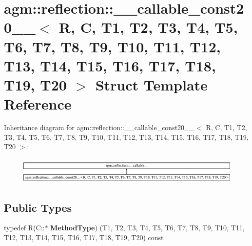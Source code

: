 \hypertarget{structagm_1_1reflection_1_1____callable__const20____}{}\section{agm\+:\+:reflection\+:\+:\+\_\+\+\_\+callable\+\_\+const20\+\_\+\+\_\+$<$ R, C, T1, T2, T3, T4, T5, T6, T7, T8, T9, T10, T11, T12, T13, T14, T15, T16, T17, T18, T19, T20 $>$ Struct Template Reference}
\label{structagm_1_1reflection_1_1____callable__const20____}
Inheritance diagram for agm\+:\+:reflection\+:\+:\+\_\+\+\_\+callable\+\_\+const20\+\_\+\+\_\+$<$ R, C, T1, T2, T3, T4, T5, T6, T7, T8, T9, T10, T11, T12, T13, T14, T15, T16, T17, T18, T19, T20 $>$\+:\begin{figure}[H]
\begin{center}
\leavevmode
\includegraphics[height=1.369193cm]{structagm_1_1reflection_1_1____callable__const20____}
\end{center}
\end{figure}
\subsection*{Public Types}
\begin{DoxyCompactItemize}
\item 
typedef R(C\+::$\ast$ {\bfseries Method\+Type}) (T1, T2, T3, T4, T5, T6, T7, T8, T9, T10, T11, T12, T13, T14, T15, T16, T17, T18, T19, T20) const \hypertarget{structagm_1_1reflection_1_1____callable__const20_____a73b3a71d693fab71eecfa7f43bd8470b}{}\label{structagm_1_1reflection_1_1____callable__const20_____a73b3a71d693fab71eecfa7f43bd8470b}

\end{DoxyCompactItemize}
